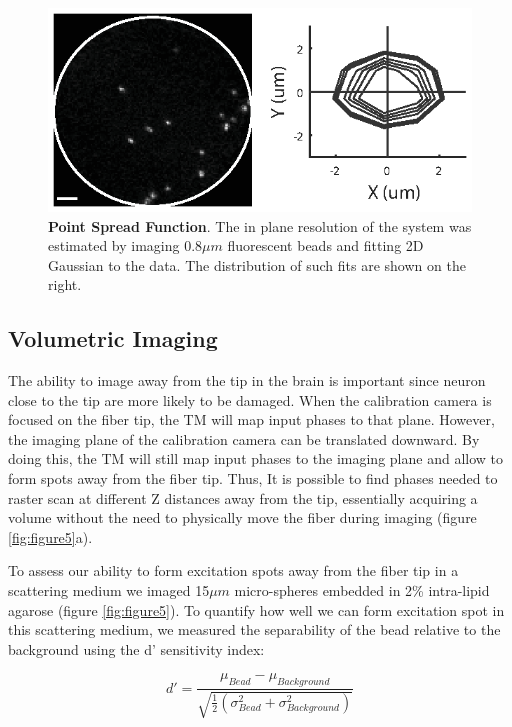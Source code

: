 \documentclass[10pt]{article}
\begin{document}
\begin{figure}
\centering\includegraphics[width=12cm]{figure6}
\caption{\textbf{Point Spread Function}. The in plane resolution of the system was estimated by imaging 0.8$\mu m$ fluorescent beads and fitting 2D Gaussian to the data. The distribution of such fits are shown on the right.}
\label{fig:figure6}
\end{figure}



\subsection{Volumetric Imaging}\label{volumetric_imaging}
The ability to image away from the tip in the brain is important since neuron close to the tip are more likely to be damaged. When the calibration camera is focused on the fiber tip, the TM will map input phases to that plane. However, the imaging plane of the calibration camera can be translated downward. By doing this, the TM will still map input phases to the imaging plane and allow to form spots away from the fiber tip. Thus, It is possible to find phases needed to raster scan at different Z distances away from the tip, essentially acquiring a volume without the need to physically move the fiber during imaging (figure \ref{fig:figure5}a). 


To assess our ability to form excitation spots
away from the fiber tip in a scattering medium we imaged 15$\mu m$ micro-spheres embedded in 2\% intra-lipid agarose (figure \ref{fig:figure5}). To quantify how well we can form excitation spot in this scattering medium, we measured the separability of the bead relative to the background using the d' sensitivity index:


\[d' = \frac{{{\mu _{Bead}} - {\mu _{Background}}}}{{\sqrt {\frac{1}{2}\left( {\sigma _{Bead}^2 + \sigma _{Background}^2} \right)} }}\]
\end{document}
